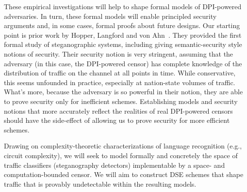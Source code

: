{These empirical investigations will help to shape formal models of DPI-powered
adversaries.  In turn, these formal models will enable principled security
arguments and, in some cases, formal proofs about future designs. Our starting
point is prior work by Hopper, Langford and von
Ahn~\cite{Hopper:Provable_Stego}. They provided the first formal study of
steganographic systems, including giving semantic-security style notions of
security.
Their security notion is very stringent, assuming that the adversary (in this
case, the DPI-powered censor) has complete knowledge of the distribution of
traffic on the channel at all points in time.  While conservative, this seems
unfounded in practice, especially at nation-state volumes of traffic.  What's
more, because the adversary is so powerful in their notion, they are able to
prove security only for inefficient schemes.
Establishing models and security notions that more accurately reflect the
realities of real DPI-powered censors should have the side-effect of allowing us
to prove security for more efficient schemes.

\begin{task} \label{task:formal-attack-models}
Drawing on complexity-theoretic characterizations of language recognition (e.g.,
circuit complexity), we will seek to model formally and concretely the space of
traffic classifiers (steganography detectors) implementable by a space- and
computation-bounded censor. We will aim to construct DSE schemes that shape
traffic that is provably undetectable within the resulting models.
\end{task}


}
